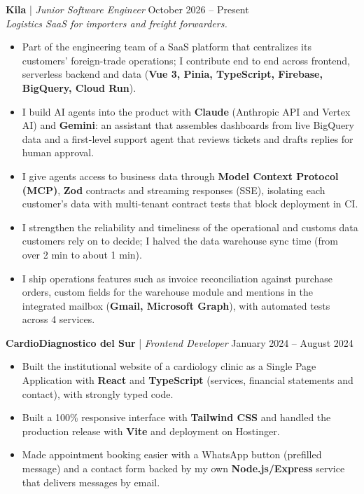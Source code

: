 \documentclass[11pt,a4paper]{article}
\begin{document}
\noindent
\textbf{Kila} | \textit{Junior Software Engineer} \hfill October 2026 – Present \\
\textit{Logistics SaaS for importers and freight forwarders.}
\begin{itemize}[leftmargin=*, noitemsep, topsep=2pt]
    \item Part of the engineering team of a SaaS platform that centralizes its customers' foreign-trade operations; I contribute end to end across frontend, serverless backend and data (\textbf{Vue 3, Pinia, TypeScript, Firebase, BigQuery, Cloud Run}).
    \item I build AI agents into the product with \textbf{Claude} (Anthropic API and Vertex AI) and \textbf{Gemini}: an assistant that assembles dashboards from live BigQuery data and a first-level support agent that reviews tickets and drafts replies for human approval.
    \item I give agents access to business data through \textbf{Model Context Protocol (MCP)}, \textbf{Zod} contracts and streaming responses (SSE), isolating each customer's data with multi-tenant contract tests that block deployment in CI.
    \item I strengthen the reliability and timeliness of the operational and customs data customers rely on to decide; I halved the data warehouse sync time (from over 2 min to about 1 min).
    \item I ship operations features such as invoice reconciliation against purchase orders, custom fields for the warehouse module and mentions in the integrated mailbox (\textbf{Gmail, Microsoft Graph}), with automated tests across 4 services.
\end{itemize}

\vspace{0.2cm}

\noindent
\textbf{CardioDiagnostico del Sur} | \textit{Frontend Developer} \hfill January 2024 – August 2024
\begin{itemize}[leftmargin=*, noitemsep, topsep=2pt]
    \item Built the institutional website of a cardiology clinic as a Single Page Application with \textbf{React} and \textbf{TypeScript} (services, financial statements and contact), with strongly typed code.
    \item Built a 100\% responsive interface with \textbf{Tailwind CSS} and handled the production release with \textbf{Vite} and deployment on Hostinger.
    \item Made appointment booking easier with a WhatsApp button (prefilled message) and a contact form backed by my own \textbf{Node.js/Express} service that delivers messages by email.
\end{itemize}
\end{document}
